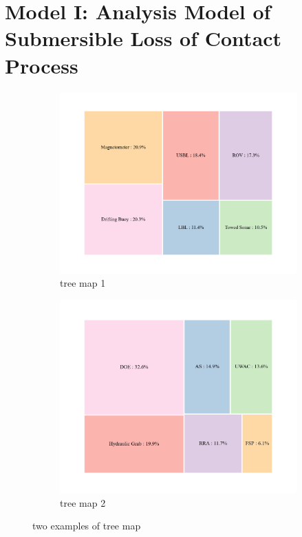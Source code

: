 \section{Model I: Analysis Model of Submersible Loss of Contact Process}

\begin{figure}[htbp]
  \centering
  \begin{subfigure}[b]{0.48\textwidth}
    \includegraphics[width=\textwidth]{../figures/treemap1.png}
    \caption{tree map 1}
    \label{fig:treemap1}
  \end{subfigure}
  \hfill
  \begin{subfigure}[b]{0.45\textwidth}
    \includegraphics[width=\textwidth]{../figures/treemap2.png}
    \caption{tree map 2}
    \label{fig:treemap2}
  \end{subfigure}
  \caption{two examples of tree map}
  \label{fig:two_treemaps}
\end{figure}



